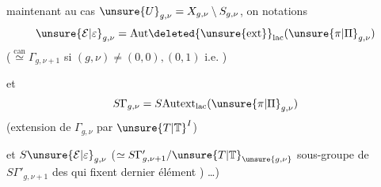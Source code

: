  maintenant au cas 
$\unsure{U}_{g,\nu}=X_{g,\nu}\setminus S_{g,\nu}$, on   notations
\[
\unsure{\mathcal E|\varepsilon}_{g,\nu}
=\mathrm{Aut}\deleted{\unsure{\mathrm{ext}}}_{\mathrm{lac}}
(\unsure{\pi|\Pi}_{g,\nu})
\]
($\stackrel{\mathrm{can}}{\simeq}\Gamma_{g,\nu+1}$ si $(g,\nu)\ne(0,0),(0,1)$ i.e. ) 

et
\[
S\Gamma_{g,\nu}=S\mathrm{Autext}_{\mathrm{lac}}(\unsure{\pi|\Pi}_{g,\nu})
\]
(extension de $\Gamma_{g,\nu}$ par $\unsure{T|\mathbb T}^I$)

et $S\unsure{\mathcal E|\varepsilon}_{g,\nu}$
($\simeq S\Gamma'_{g,\nu+1}/\unsure{T|\mathbb T}_{\unsure{g,\nu}}$
sous-groupe de $S\Gamma'_{g,\nu+1}$ des  qui fixent  dernier élément ) \ldots)
